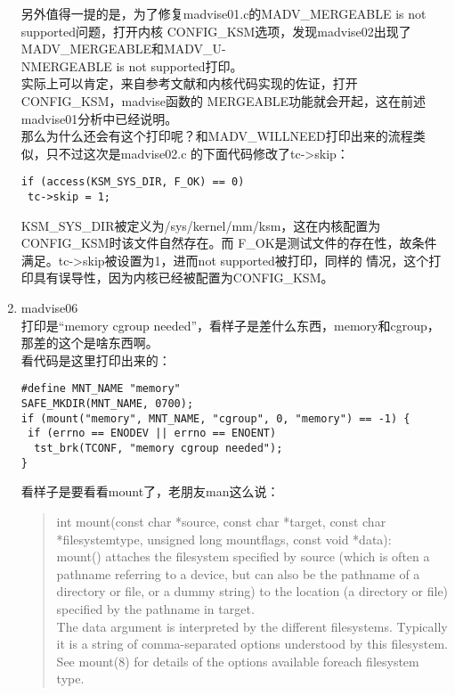 \documentclass[scheme=plain]{ctexart}
\begin{document}
\begin{enumerate}
  另外值得一提的是，为了修复madvise01.c的MADV\_MERGEABLE is not supported问题，打开内核
  CONFIG\_KSM选项，发现madvise02出现了MADV\_MERGEABLE和MADV\_U-\\NMERGEABLE is not
  supported打印。\\

  实际上可以肯定，来自参考文献和内核代码实现的佐证，打开CONFIG\_KSM，madvise函数的
  MERGEABLE功能就会开起，这在前述madvise01分析中已经说明。\\

  那么为什么还会有这个打印呢？和MADV\_WILLNEED打印出来的流程类似，只不过这次是madvise02.c
  的下面代码修改了tc->skip：
\begin{verbatim}
if (access(KSM_SYS_DIR, F_OK) == 0)
 tc->skip = 1;
\end{verbatim}

  KSM\_SYS\_DIR被定义为/sys/kernel/mm/ksm，这在内核配置为CONFIG\_KSM时该文件自然存在。而
  F\_OK是测试文件的存在性，故条件满足。tc->skip被设置为1，进而not supported被打印，同样的
  情况，这个打印具有误导性，因为内核已经被配置为CONFIG\_KSM。
  
  
\item madvise06\\
  打印是“memory cgroup needed”，看样子是差什么东西，memory和cgroup，那差的这个是啥东西啊。\\
  
  看代码是这里打印出来的：
\begin{verbatim}
#define MNT_NAME "memory"
SAFE_MKDIR(MNT_NAME, 0700);
if (mount("memory", MNT_NAME, "cgroup", 0, "memory") == -1) {
 if (errno == ENODEV || errno == ENOENT)
  tst_brk(TCONF, "memory cgroup needed");
}
\end{verbatim}

  看样子是要看看mount了，老朋友man这么说：
  
  \begin{quote}
    int mount(const char *source, const char *target,
    const char *filesystemtype, unsigned long mountflags,
    const void *data):\\
    mount()  attaches the filesystem specified by source (which is often a pathname
    referring to a device, but can also be the pathname of a directory or file, or a dummy
    string) to the location (a directory or file) specified by the pathname in target.\\

    The  data  argument  is  interpreted  by  the  different filesystems.  Typically it is
    a string of comma-separated options understood by this filesystem.  See mount(8) for
    details of the options available foreach filesystem type.
  \end{quote}


\end{enumerate}
\end{document}
